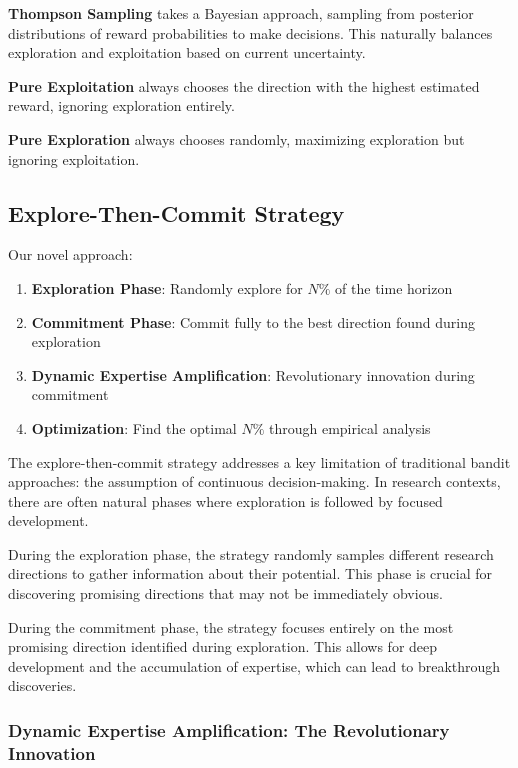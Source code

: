 \documentclass[letterpaper]{article} %
\begin{document}
\textbf{Thompson Sampling} takes a Bayesian approach, sampling from posterior distributions of reward probabilities to make decisions. This naturally balances exploration and exploitation based on current uncertainty.

\textbf{Pure Exploitation} always chooses the direction with the highest estimated reward, ignoring exploration entirely.

\textbf{Pure Exploration} always chooses randomly, maximizing exploration but ignoring exploitation.

\subsection{Explore-Then-Commit Strategy}

Our novel approach:
\begin{enumerate}
\item \textbf{Exploration Phase}: Randomly explore for $N\%$ of the time horizon
\item \textbf{Commitment Phase}: Commit fully to the best direction found during exploration
\item \textbf{Dynamic Expertise Amplification}: Revolutionary innovation during commitment
\item \textbf{Optimization}: Find the optimal $N\%$ through empirical analysis
\end{enumerate}

The explore-then-commit strategy addresses a key limitation of traditional bandit approaches: the assumption of continuous decision-making. In research contexts, there are often natural phases where exploration is followed by focused development.

During the exploration phase, the strategy randomly samples different research directions to gather information about their potential. This phase is crucial for discovering promising directions that may not be immediately obvious.

During the commitment phase, the strategy focuses entirely on the most promising direction identified during exploration. This allows for deep development and the accumulation of expertise, which can lead to breakthrough discoveries.

\subsubsection{Dynamic Expertise Amplification: The Revolutionary Innovation}
\end{document}
